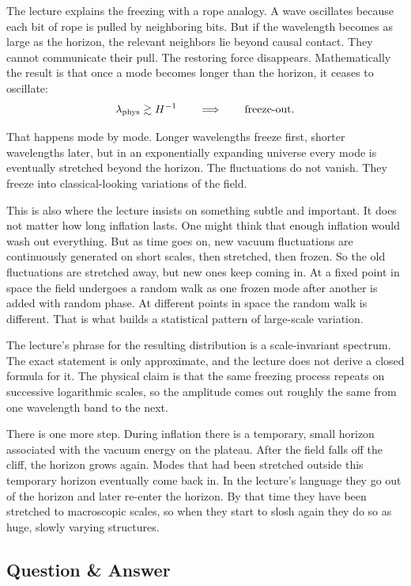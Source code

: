 The lecture explains the freezing with a rope analogy. A wave oscillates because each bit of rope is pulled by neighboring bits. But if the wavelength becomes as large as the horizon, the relevant neighbors lie beyond causal contact. They cannot communicate their pull. The restoring force disappears. Mathematically the result is that once a mode becomes longer than the horizon, it ceases to oscillate:
\begin{equation}
\lambda_{\rm phys}\gtrsim H^{-1}
\qquad \Longrightarrow \qquad
\text{freeze-out}.
\end{equation}

That happens mode by mode. Longer wavelengths freeze first, shorter wavelengths later, but in an exponentially expanding universe every mode is eventually stretched beyond the horizon. The fluctuations do not vanish. They freeze into classical-looking variations of the field.

This is also where the lecture insists on something subtle and important. It does not matter how long inflation lasts. One might think that enough inflation would wash out everything. But as time goes on, new vacuum fluctuations are continuously generated on short scales, then stretched, then frozen. So the old fluctuations are stretched away, but new ones keep coming in. At a fixed point in space the field undergoes a random walk as one frozen mode after another is added with random phase. At different points in space the random walk is different. That is what builds a statistical pattern of large-scale variation.

The lecture's phrase for the resulting distribution is a scale-invariant spectrum. The exact statement is only approximate, and the lecture does not derive a closed formula for it. The physical claim is that the same freezing process repeats on successive logarithmic scales, so the amplitude comes out roughly the same from one wavelength band to the next.

There is one more step. During inflation there is a temporary, small horizon associated with the vacuum energy on the plateau. After the field falls off the cliff, the horizon grows again. Modes that had been stretched outside this temporary horizon eventually come back in. In the lecture's language they go out of the horizon and later re-enter the horizon. By that time they have been stretched to macroscopic scales, so when they start to slosh again they do so as huge, slowly varying structures.

\subsection{Question \& Answer}

